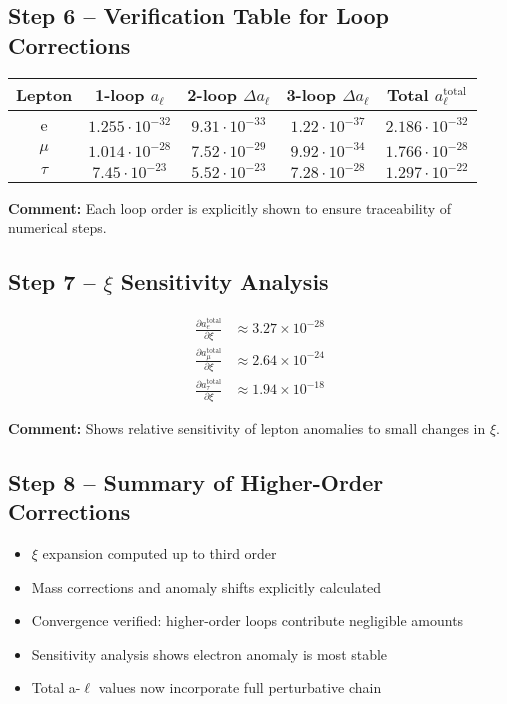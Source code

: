 \documentclass[12pt,a4paper]{article}
\begin{document}
\subsection{Step 6 – Verification Table for Loop Corrections}

\begin{tabular}{|c|c|c|c|c|}
	\hline
	Lepton & 1-loop $a_\ell$ & 2-loop $\Delta a_\ell$ & 3-loop $\Delta a_\ell$ & Total $a_\ell^\text{total}$ \\
	\hline
	e & $1.255 \cdot 10^{-32}$ & $9.31 \cdot 10^{-33}$ & $1.22 \cdot 10^{-37}$ & $2.186 \cdot 10^{-32}$ \\
	\hline
	$\mu$ & $1.014 \cdot 10^{-28}$ & $7.52 \cdot 10^{-29}$ & $9.92 \cdot 10^{-34}$ & $1.766 \cdot 10^{-28}$ \\
	\hline
	$\tau$ & $7.45 \cdot 10^{-23}$ & $5.52 \cdot 10^{-23}$ & $7.28 \cdot 10^{-28}$ & $1.297 \cdot 10^{-22}$ \\
	\hline
\end{tabular}

\textbf{Comment:} Each loop order is explicitly shown to ensure traceability of numerical steps.

\subsection{Step 7 – $\xi$ Sensitivity Analysis}

\begin{align}
	\frac{\partial a_e^\text{total}}{\partial \xi} &\approx 3.27 \times 10^{-28} \\
	\frac{\partial a_\mu^\text{total}}{\partial \xi} &\approx 2.64 \times 10^{-24} \\
	\frac{\partial a_\tau^\text{total}}{\partial \xi} &\approx 1.94 \times 10^{-18}
\end{align}

\textbf{Comment:} Shows relative sensitivity of lepton anomalies to small changes in $\xi$.

\subsection{Step 8 – Summary of Higher-Order Corrections}

\begin{itemize}
	\item $\xi$ expansion computed up to third order
	\item Mass corrections and anomaly shifts explicitly calculated
	\item Convergence verified: higher-order loops contribute negligible amounts
	\item Sensitivity analysis shows electron anomaly is most stable
	\item Total a-$\ell$ values now incorporate full perturbative chain
\end{itemize}
\end{document}
